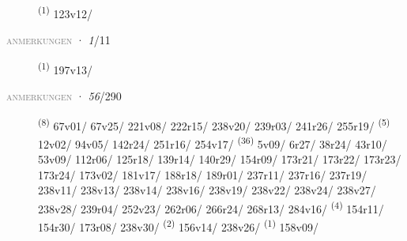 \begin{description}
    \item[]  \textsuperscript{(1)} \mbox{123v12/}
\end{description}
\textsc{\textcolor{gray}{anmerkungen}}
\ENTRYEND
\noindent{} · \textit{1}/11 \LEMMALINE
\begin{description}
    \item[]  \textsuperscript{(1)} \mbox{197v13/}
\end{description}
\textsc{\textcolor{gray}{anmerkungen}}
\ENTRYEND
\noindent{} · \textit{56}/290 \LEMMALINE
\begin{description}
    \item[]  \textsuperscript{(8)} \mbox{67v01/} \mbox{67v25/} \mbox{221v08/} \mbox{222r15/} \mbox{238v20/} \mbox{239r03/} \mbox{241r26/} \mbox{255r19/} \CASEBREAK {} \textsuperscript{(5)} \mbox{12v02/} \mbox{94v05/} \mbox{142r24/} \mbox{251r16/} \mbox{254v17/} \CASEBREAK {} \textsuperscript{(36)} \mbox{5v09/} \mbox{6r27/} \mbox{38r24/} \mbox{43r10/} \mbox{53v09/} \mbox{112r06/} \mbox{125r18/} \mbox{139r14/} \mbox{140r29/} \mbox{154r09/} \mbox{173r21/} \mbox{173r22/} \mbox{173r23/} \mbox{173r24/} \mbox{173v02/} \mbox{181v17/} \mbox{188r18/} \mbox{189r01/} \mbox{237r11/} \mbox{237r16/} \mbox{237r19/} \mbox{238v11/} \mbox{238v13/} \mbox{238v14/} \mbox{238v16/} \mbox{238v19/} \mbox{238v22/} \mbox{238v24/} \mbox{238v27/} \mbox{238v28/} \mbox{239r04/} \mbox{252v23/} \mbox{262r06/} \mbox{266r24/} \mbox{268r13/} \mbox{284v16/} \textsuperscript{(4)} \mbox{154r11/} \mbox{154r30/} \mbox{173r08/} \mbox{238v30/} \textsuperscript{(2)} \mbox{156v14/} \mbox{238v26/} \textsuperscript{(1)} \mbox{158v09/}
\end{description}
